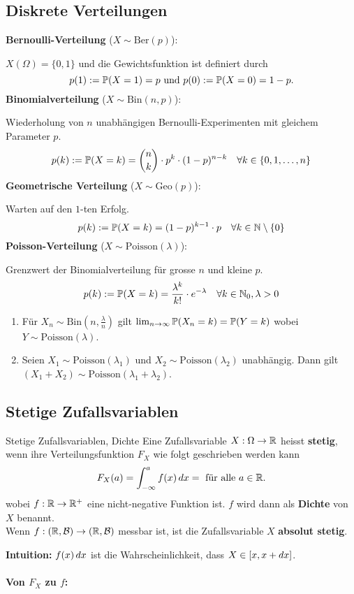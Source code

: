 \subsection{Diskrete Verteilungen}
\textbf{Bernoulli-Verteilung} ($X \sim \text{Ber}(p)$): 

$X(\Omega)= \{0, 1\}$ und die Gewichtsfunktion ist definiert durch
$$p(1):= \P(X = 1) = p \text{ und } p(0):=\P(X = 0) = 1 - p.$$
\textbf{Binomialverteilung} ($X \sim \text{Bin}(n, p)$): 

Wiederholung von $n$ unabhängigen Bernoulli-Experimenten mit gleichem Parameter $p$. 
$$p(k):= \P(X = k) = \binom{n}{k} \cdot p^k \cdot (1-p)^{n-k} \quad \forall k \in \{0,1,\ldots, n\}$$
\textbf{Geometrische Verteilung} ($X \sim \text{Geo}(p)$): 

Warten auf den $1$-ten Erfolg. 
$$p(k):= \P(X = k) = (1-p)^{k-1}\cdot p \quad \forall k \in \N\setminus\{0\}$$
\textbf{Poisson-Verteilung} ($X \sim \text{Poisson}(\lambda)$): 

Grenzwert der Binomialverteilung für grosse $n$ und kleine $p$. 
$$p(k) := \P(X = k) = \frac{\lambda^k}{k!}\cdot e^{-\lambda} \quad \forall k \in \N_0, \lambda > 0$$
\begin{enumerate}
    \item Für $X_n \sim \text{Bin}(n, \frac{\lambda}{n})$ gilt $\lim_{n \to \infty}\P(X_n = k) = \P(Y = k)$ wobei $Y \sim \text{Poisson}(\lambda)$.
    \item Seien $X_1 \sim \text{Poisson}(\lambda_1)$ und $X_2 \sim \text{Poisson}(\lambda_2)$ unabhängig. Dann gilt $(X_1 + X_2) \sim \text{Poisson}(\lambda_1 +\lambda_2)$.
\end{enumerate}

\subsection{Stetige Zufallsvariablen}
\begin{mainbox}{Stetige Zufallsvariablen, Dichte}
    Eine Zufallsvariable $X: \Omega \to \R$ heisst \textbf{stetig}, wenn ihre Verteilungsfunktion $F_X$ wie folgt geschrieben werden kann
    $$F_X(a) = \int_{-\infty}^{a}f(x)\dx = \text{ für alle }a \in \R.$$
    wobei $f: \R \to \R^+$ eine nicht-negative Funktion ist. $f$ wird dann als \textbf{Dichte} von $X$ benannt.\\
    Wenn $f: (\R, \mathcal{B}) \to (\R, \mathcal{B})$ messbar ist, ist die Zufallsvariable $X$ \textbf{absolut stetig}.
\end{mainbox}
\textbf{Intuition:} $f(x)\dx$ ist die Wahrscheinlichkeit, dass $X \in [x, x + \dx]$.
\\ \\
\textbf{Von $F_X$ zu $f$:} 


